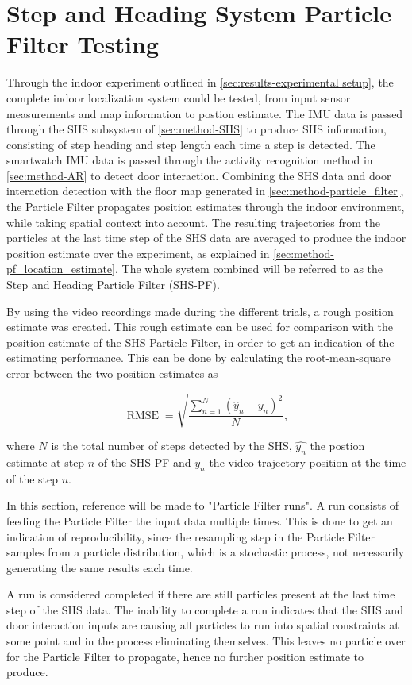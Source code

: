 \section[SHS-PF Testing]{Step and Heading System Particle Filter Testing}
\label{sec:results-SHSPF}
Through the indoor experiment outlined in \cref{sec:results-experimental setup}, the complete indoor localization system could be tested, from input sensor measurements and map information to postion estimate. The IMU data is passed through the \ac{SHS} subsystem of \cref{sec:method-SHS} to produce \ac{SHS} information, consisting of step heading and step length each time a step is detected. The smartwatch IMU data is passed through the activity recognition method in \cref{sec:method-AR} to  detect door interaction. Combining the \ac{SHS} data and door interaction detection with the floor map generated in \cref{sec:method-particle_filter}, the Particle Filter propagates position estimates through the indoor environment, while taking spatial context into account. The resulting trajectories from the particles at the last time step of the SHS data are averaged to produce the indoor position estimate over the experiment, as explained in \cref{sec:method-pf_location_estimate}. The whole system combined will be referred to as the Step and Heading Particle Filter (SHS-PF).  \par 

By using the video recordings made during the different trials, a rough position estimate was created. This rough estimate can be used for comparison with the position estimate of the \ac{SHS} Particle Filter, in order to get an indication of the estimating performance. This can be done by calculating the root-mean-square error between the two position estimates as

\begin{equation}
	\displaystyle \operatorname {RMSE} ={\sqrt {\frac {\sum _{n=1}^{N}({\hat {y}}_{n}-y_{n})^{2}}{N}}},
	\label{eq:RMSE}
\end{equation}

where $N$ is the total number of steps detected by the SHS, $\hat{y_n}$ the postion estimate at step $n$ of the SHS-PF and $y_n$ the video trajectory position at the time of the step $n$. \par 

In this section, reference will be made to "Particle Filter runs". A run consists of feeding the Particle Filter the input data multiple times. This is done to get an indication of reproducibility, since the resampling step in the Particle Filter samples from a particle distribution, which is a stochastic process, not necessarily generating the same results each time.\par 
A run is considered completed if there are still particles present at the last time step of the SHS data. The inability to complete a run indicates that the SHS and door interaction inputs are causing all particles to run into spatial constraints at some point and in the process eliminating themselves. This leaves no particle over for the Particle Filter to propagate, hence no further position estimate to produce.

